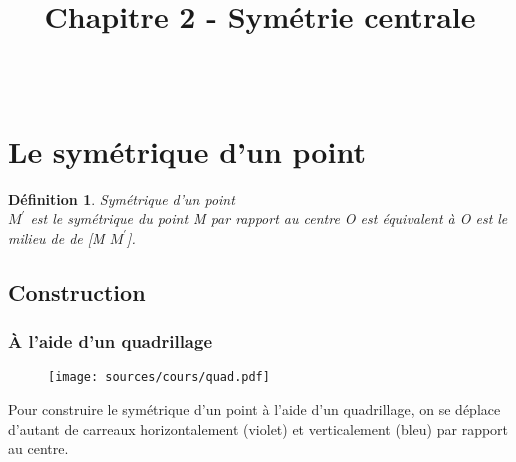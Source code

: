 \documentclass[paper=a4, fontsize=10pt]{scrartcl} %
\title{	
  \vspace{-10ex}
  \horrule{0.5pt} \\[0.4cm] %
  \huge Chapitre 2 - Symétrie centrale\\ %
  \horrule{2pt} \\[0.5cm] %
}
\author{}
\date{\vspace{-10ex}} %
\begin{document}

\newtheorem{Definition}{Définition}
\newtheorem{Theorem}{Théorème}
\newtheorem{Proposition}{Proposition}

\renewcommand{\labelitemi}{$\bullet$}
\renewcommand{\labelitemii}{$\circ$}

\maketitle %

\section{Le symétrique d'un point}

\begin{Definition}{Symétrique d'un point}\\
  \label{def:ch2-1.sympt}
  $M^{'}$ est le symétrique du point M par rapport au centre O est équivalent à O est le milieu de de [M $M^{'}$].
\end{Definition}

\subsection{Construction}

\subsubsection{À l'aide d'un quadrillage}

\begin{figure}[H]
  \centering
  \texttt{[image: sources/cours/quad.pdf]}
  \label{fig:ch2-quad}
\end{figure}

Pour construire le symétrique d'un point à l'aide d'un quadrillage, on se déplace d'autant de carreaux horizontalement (violet) et verticalement (bleu) par rapport au centre.
\end{document}
